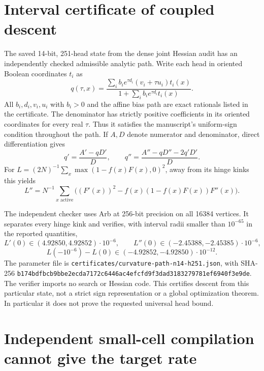 \documentclass[11pt]{article}
\begin{document}
\section{Interval certificate of coupled descent}

The saved 14-bit, 251-head state from the dense joint Hessian audit has
an independently checked admissible analytic path. Write each head in
oriented Boolean coordinates $t_i$ as
\[
 q(\tau,x)=\frac{\sum_i b_i e^{\tau d_i}(v_i+\tau u_i)t_i(x)}
 {1+\sum_i b_i e^{\tau d_i}t_i(x)}.
\]
All $b_i,d_i,v_i,u_i$ with $b_i>0$ and the affine bias path are exact rationals
listed in the certificate. The denominator has strictly positive
coefficients in its oriented coordinates for every real $\tau$.
Thus it satisfies the manuscript's uniform-sign condition throughout
the path. If $A,D$ denote numerator and denominator, direct
differentiation gives
\[
 q'=\frac{A'-qD'}D,
 \qquad q''=\frac{A''-qD''-2q'D'}D.
\]
For $L=(2N)^{-1}\sum_x\max(1-f(x)F(x),0)^2$, away from its hinge
kinks this yields
\[
 L''=N^{-1}\sum_{x\text{ active}}
 \bigl((F'(x))^2-f(x)(1-f(x)F(x))F''(x)\bigr).
\]

The independent checker uses Arb at 256-bit precision on all 16384
vertices. It separates every hinge kink and verifies, with interval
radii smaller than $10^{-65}$ in the reported quantities,
\[
 L'(0)\in(4.92850,4.92852)\cdot10^{-6},
 \qquad L''(0)\in(-2.45388,-2.45385)\cdot10^{-6},
\]
\[
 L(-10^{-6})-L(0)\in(-4.92852,-4.92850)\cdot10^{-12}.
\]
The parameter file is
\texttt{certificates/curvature-path-n14-h251.json}, with SHA-256
\texttt{b174bdfbcb9bbe2ecda7172c6446ac4efcfd9f3dad3183279781ef6940f3e9de}.
The verifier imports no search or Hessian code. This certifies descent
from this particular state, not a strict sign representation or a
global optimization theorem. In particular it does not prove the
requested universal head bound.


\section{Independent small-cell compilation cannot give the target rate}
\end{document}
